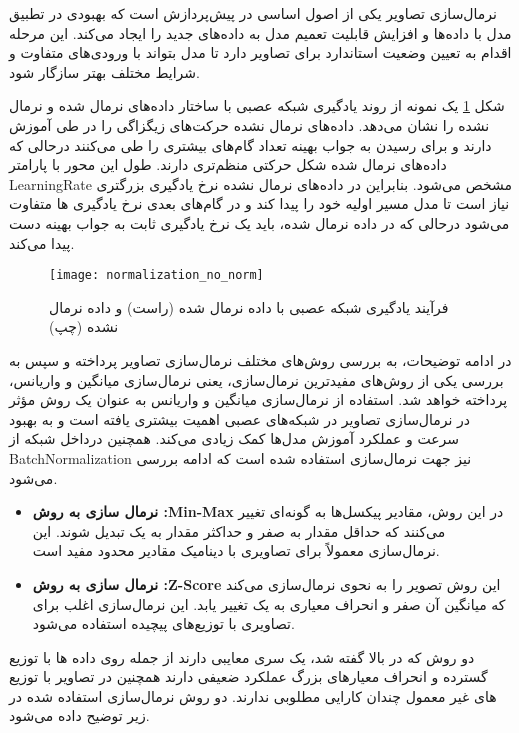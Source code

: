 نرمال‌سازی تصاویر یکی از اصول اساسی در پیش‌پردازش است که بهبودی در تطبیق مدل با داده‌ها و افزایش قابلیت تعمیم مدل به داده‌های جدید را ایجاد می‌کند. این مرحله اقدام به تعیین وضعیت استاندارد برای تصاویر دارد تا مدل بتواند با ورودی‌های متفاوت و شرایط مختلف بهتر سازگار شود.

شکل %
\ref{fig:normalization_no_norm}
یک نمونه از روند یادگیری شبکه عصبی با ساختار داده‌های نرمال‌ شده و نرمال نشده را نشان می‌دهد. داده‌های نرمال نشده حرکت‌های زیگزاگی را در طی آموزش دارند و برای رسیدن به جواب بهینه تعداد گام‌های بیشتری را طی می‌کنند درحالی که داده‌های نرمال شده شکل حرکتی منظم‌تری دارند. طول این محور با پارامتر %
\gls{LearningRate}
مشخص می‌شود. بنابراین در داده‌های نرمال نشده نرخ یادگیری بزرگتری نیاز است تا مدل مسیر اولیه خود را پیدا کند و در گام‌های بعدی نرخ یادگیری ها متفاوت می‌شود درحالی که در داده نرمال شده،‌ باید یک نرخ یادگیری ثابت به جواب بهینه دست پیدا می‌کند.

\begin{figure}[ht]
	\centerline{\texttt{[image: normalization\_no\_norm]}}
	\caption[فرآیند یادگیری شبکه عصبی با داده نرمال شده و داده نرمال نشده ]{فرآیند یادگیری شبکه عصبی با داده نرمال شده (راست) و داده نرمال نشده (چپ)
	 \cite{Normal_not_Normal}
	}
	\label{fig:normalization_no_norm}
\end{figure}

در ادامه توضیحات، به بررسی روش‌های مختلف نرمال‌سازی تصاویر پرداخته و سپس به بررسی یکی از روش‌های مفید‌ترین نرمال‌سازی، یعنی  نرمال‌سازی میانگین و واریانس، پرداخته خواهد شد. استفاده از  نرمال‌سازی میانگین و واریانس به عنوان یک روش مؤثر در نرمال‌سازی تصاویر در شبکه‌های عصبی اهمیت بیشتری یافته است و به بهبود سرعت و عملکرد آموزش مدل‌ها کمک زیادی می‌کند. همچنین درداخل شبکه از %
\gls{BatchNormalization}
 نیز جهت نرمال‌سازی استفاده شده است که ادامه بررسی می‌شود.
\begin{itemize}
	\item \textbf{نرمال سازی به روش :Min-Max }
	در این روش، مقادیر پیکسل‌ها به گونه‌ای تغییر می‌کنند که حداقل مقدار به صفر و حداکثر مقدار به یک تبدیل شوند. این نرمال‌سازی معمولاً برای تصاویری با دینامیک مقادیر محدود مفید است.
	\item \textbf{نرمال سازی به روش :Z-Score }
	 این روش تصویر را به نحوی نرمال‌سازی می‌کند که میانگین آن صفر و انحراف معیاری به یک تغییر یابد. این نرمال‌سازی اغلب برای تصاویری با توزیع‌های پیچیده استفاده می‌شود.
\end{itemize}
دو روش که در بالا گفته شد، یک سری معایبی دارند از جمله روی داده ها با توزیع گسترده و انحراف معیار‌های بزرگ عملکرد ضعیفی دارند همچنین در تصاویر با توزیع های غیر معمول چندان کارایی مطلوبی ندارند. دو روش نرمال‌سازی استفاده شده در زیر توضیح داده می‌شود.

